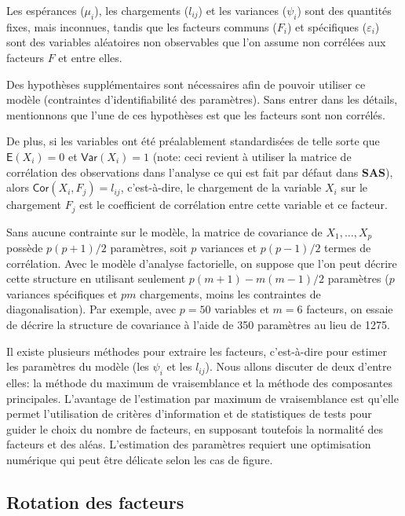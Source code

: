 \documentclass[
  11pt,
  letterpaper,
]{book}
\theoremstyle{definition}
\theoremstyle{definition}
\theoremstyle{definition}
\theoremstyle{remark}
\begin{document}
Les espérances (\(\mu_i\)), les chargements (\(l_{ij}\)) et les variances (\(\psi_i\)) sont des quantités fixes, mais inconnues, tandis que les facteurs communs (\(F_i\)) et spécifiques (\(\varepsilon_i\)) sont des variables aléatoires non observables que l'on assume non corrélées aux facteurs \(F\) et entre elles.

Des hypothèses supplémentaires sont nécessaires afin de pouvoir utiliser ce modèle (contraintes d'identifiabilité des paramètres). Sans entrer dans les détails, mentionnons que l'une de ces hypothèses est que les facteurs sont non corrélés.

De plus, si les variables ont été préalablement standardisées de telle sorte que \({\mathsf E}\left(X_i\right)=0\) et \({\mathsf{Var}}\left(X_i\right)=1\) (note: ceci revient à utiliser la matrice de corrélation des observations dans l'analyse ce qui est fait par défaut dans \textbf{SAS}), alors \({\mathsf{Cor}}\left(X_i, F_j\right)=l_{ij}\), c'est-à-dire, le chargement de la variable \(X_i\) sur le chargement \(F_j\) est le coefficient de corrélation entre cette variable et ce facteur.

Sans aucune contrainte sur le modèle, la matrice de covariance de \(X_1, \ldots, X_p\) possède \(p(p+1)/2\) paramètres, soit \(p\) variances et \(p(p-1)/2\) termes de corrélation. Avec le modèle d'analyse factorielle, on suppose que l'on peut décrire cette structure en utilisant seulement \(p(m+1) - m(m-1)/2\) paramètres (\(p\) variances spécifiques et \(pm\) chargements, moins les contraintes de diagonalisation). Par exemple, avec \(p=50\) variables et \(m=6\) facteurs, on essaie de décrire la structure de covariance à l'aide de 350 paramètres au lieu de 1275.

Il existe plusieurs méthodes pour extraire les facteurs, c'est-à-dire pour estimer les paramètres du modèle (les \(\psi_i\) et les \(l_{ij}\)). Nous allons discuter de deux d'entre elles: la méthode du maximum de vraisemblance et la méthode des composantes principales. L'avantage de l'estimation par maximum de vraisemblance est qu'elle permet l'utilisation de critères d'information et de statistiques de tests pour guider le choix du nombre de facteurs, en supposant toutefois la normalité des facteurs et des aléas. L'estimation des paramètres requiert une optimisation numérique qui peut être délicate selon les cas de figure.

\hypertarget{rotation-des-facteurs}{%
\subsection{Rotation des facteurs}\label{rotation-des-facteurs}}
\end{document}
